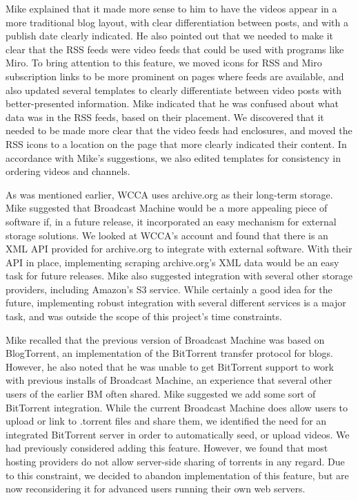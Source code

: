 \documentclass[a4paper,12pt]{report}
\begin{document}
Mike explained that it made more sense to him to have the videos appear in a more traditional blog layout, with clear 
differentiation between posts, and with a publish date clearly indicated. 
He also pointed out that we needed to make it clear that the RSS feeds were video feeds that could be used with 
programs like Miro. To bring attention to this feature, we moved icons for RSS and Miro subscription links to be more prominent on pages where feeds are available, and also updated several templates to clearly differentiate between video posts with better-presented information. Mike indicated that he was confused about what data was in the RSS feeds, based on their placement. We discovered that it needed to be made more clear that the video feeds had enclosures, and moved the RSS icons to a location on the page that more clearly indicated their content. In accordance with Mike's suggestions, we also edited templates for consistency in ordering videos and channels.

As was mentioned earlier, WCCA uses archive.org as their long-term storage. 
Mike suggested that Broadcast Machine would be a more appealing piece of software if, in a future release, it 
incorporated an easy mechanism for external storage solutions. 
We looked at WCCA's account and found that there is an XML API provided for archive.org to integrate with external 
software. With their API in place, implementing scraping archive.org's XML data would be an easy task for future releases. Mike also suggested integration with several other storage providers, including Amazon's S3 service. While certainly a good idea for the future, implementing robust integration with several different services is a major task, and was outside the scope of this project's time constraints.

Mike recalled that the previous version of Broadcast Machine was based on BlogTorrent, an implementation of the BitTorrent transfer protocol for blogs. 
However, he also noted that he was unable to get BitTorrent support to work with previous installs of Broadcast Machine, an experience that several other users of the earlier BM often shared. 
Mike suggested we add some sort of BitTorrent integration.
While the current Broadcast Machine does allow users to upload or link to .torrent files and share them, we identified the need for an integrated BitTorrent server in order to automatically seed, or upload videos. We had previously considered adding this feature. However, we found that most hosting providers do not allow server-side sharing of torrents in any regard. Due to this constraint, we decided to abandon implementation of this feature, but are now reconsidering it for advanced users running their own web servers.
\end{document}
